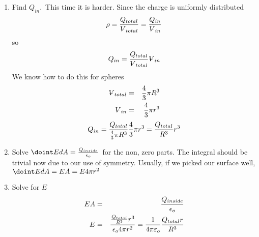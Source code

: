 \documentclass{article}
\begin{document}
\begin{enumerate}
\item {\small Find }$Q_{in}.${\small \ This time it is harder. Since the
charge is uniformly distributed }%
\[
\rho =\frac{Q_{total}}{%
\ooalign{\hfil$V$\hfil\cr\kern0.1em--\hfil\cr}%
_{total}}=\frac{Q_{in}}{%
\ooalign{\hfil$V$\hfil\cr\kern0.1em--\hfil\cr}%
_{in}}
\]%
{\small so }%
\[
Q_{in}=\frac{Q_{total}}{%
\ooalign{\hfil$V$\hfil\cr\kern0.1em--\hfil\cr}%
_{total}}%
\ooalign{\hfil$V$\hfil\cr\kern0.1em--\hfil\cr}%
_{in}
\]%
{\small We know how to do this for spheres }%
\begin{eqnarray*}
\ooalign{\hfil$V$\hfil\cr\kern0.1em--\hfil\cr}%
_{total} &=&\frac{4}{3}\pi R^{3} \\
\ooalign{\hfil$V$\hfil\cr\kern0.1em--\hfil\cr}%
_{in} &=&\frac{4}{3}\pi r^{3}
\end{eqnarray*}%
\[
Q_{in}=\frac{Q_{total}}{\frac{4}{3}\pi R^{3}}\frac{4}{3}\pi r^{3}=\frac{%
Q_{total}}{R^{3}}r^{3}
\]

\item {\small Solve }$\doint EdA=\frac{Q_{inside}}{\epsilon _{o}}${\small \
for the non, zero parts. The integral should be trivial now due to our use
of symmetry. Usually, if we picked our surface well, }$\doint EdA=EA=E4\pi
r^{2}$

\item {\small Solve for }$E$%
\begin{eqnarray*}
EA &=&\frac{Q_{inside}}{\epsilon _{o}} \\
E &=&\frac{\frac{Q_{total}}{R^{3}}r^{3}}{\epsilon _{o}4\pi r^{2}}=\frac{1}{%
4\pi \varepsilon _{o}}\frac{Q_{total}r}{R^{3}}
\end{eqnarray*}
\end{enumerate}

\normalsize%
\end{document}
